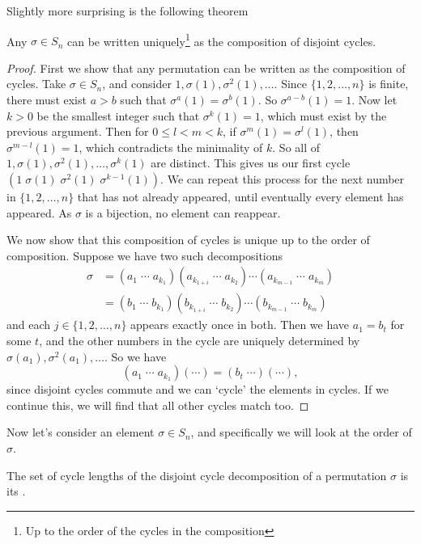 \documentclass[a4]{scrreprt}
\begin{document}
Slightly more surprising is the following theorem
\begin{theorem}
	Any $\sigma \in S_n$ can be written uniquely\footnote{Up to the order of the cycles in the composition} as the composition of disjoint cycles.
\end{theorem}
\begin{proof}
	First we show that any permutation can be written as the composition of cycles.
	Take $\sigma \in S_n$, and consider $1, \sigma(1), \sigma^2(1), \dots$. Since $\{1, 2, \dots, n\}$ is finite, there must exist $a > b$ such that $\sigma^a(1) = \sigma^b(1)$. So $\sigma^{a -b}(1) = 1$. Now let $k > 0$ be the smallest integer such that $\sigma^k(1) = 1$, which must exist by the previous argument. Then for $0 \leq l < m < k$, if $\sigma^m(1) = \sigma^l(1)$, then $\sigma^{m - l}(1) = 1$, which contradicts the minimality of $k$. So all of $1, \sigma(1), \sigma^2(1), \dots, \sigma^k(1)$ are distinct. This gives us our first cycle $(1\; \sigma(1)\; \sigma^2(1)\; \sigma^{k - 1}(1))$.
	We can repeat this process for the next number in $\{1, 2, \dots, n\}$ that has not already appeared, until eventually every element has appeared. As $\sigma$ is a bijection, no element can reappear.

	We now show that this composition of cycles is unique up to the order of composition. Suppose we have two such decompositions
	\begin{align*}
		\sigma &= (a_1 \; \cdots \; a_{k_1}) (a_{k_{1 + i}} \; \cdots \; a_{k_2}) \cdots (a_{k_{m - 1}} \; \cdots \; a_{k_m})\\
		  &= (b_1 \; \cdots \; b_{k_1}) (b_{k_{1 + i}} \; \cdots \; b_{k_2}) \cdots (b_{k_{m - 1}} \; \cdots \; b_{k_m})
	\end{align*}
	and each $j \in \{1, 2, \dots, n\}$ appears exactly once in both. Then we have $a_1 = b_t$ for some $t$, and the other numbers in the cycle are uniquely determined by $\sigma(a_1), \sigma^2(a_1), \dots$. So we have
	$$
	(a_1\; \cdots\; a_{k_1}) (\cdots) = (b_t\; \cdots)(\cdots),
	$$
	since disjoint cycles commute and we can `cycle' the elements in cycles. If we continue this, we will find that all other cycles match too.
\end{proof}

Now let's consider an element $\sigma \in S_n$, and specifically we will look at the order of $\sigma$.

\begin{definition}
	The set of cycle lengths of the disjoint cycle decomposition of a permutation $\sigma$ is its .
\end{definition}
\end{document}
